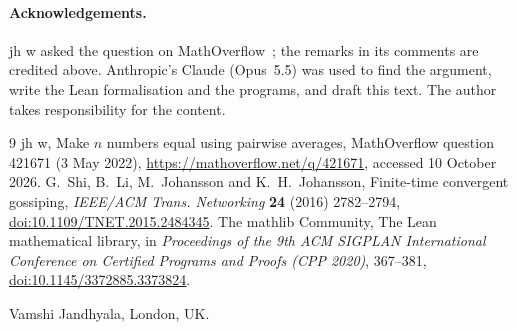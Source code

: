 \documentclass[11pt]{article}
\theoremstyle{remark}
\begin{document}
\paragraph{Acknowledgements.} jh w asked the question on MathOverflow~\cite{MO}; the remarks in its comments
are credited above. Anthropic's Claude (Opus~5.5) was used to find the argument, write the Lean
formalisation and the programs, and draft this text. The author takes responsibility for the content.

\begin{thebibliography}{9}
 jh w, Make $n$ numbers equal using pairwise averages, MathOverflow question 421671 (3 May 2022),
\url{https://mathoverflow.net/q/421671}, accessed 10 October 2026.
 G.~Shi, B.~Li, M.~Johansson and K.~H.~Johansson, Finite-time convergent gossiping,
\emph{IEEE/ACM Trans. Networking} \textbf{24} (2016) 2782--2794,
\href{https://doi.org/10.1109/TNET.2015.2484345}{doi:10.1109/TNET.2015.2484345}.
 The mathlib Community, The Lean mathematical library, in \emph{Proceedings of the 9th ACM
SIGPLAN International Conference on Certified Programs and Proofs (CPP 2020)}, 367--381,
\href{https://doi.org/10.1145/3372885.3373824}{doi:10.1145/3372885.3373824}.
\end{thebibliography}

\bigskip
\noindent Vamshi Jandhyala, London, UK.
\end{document}
